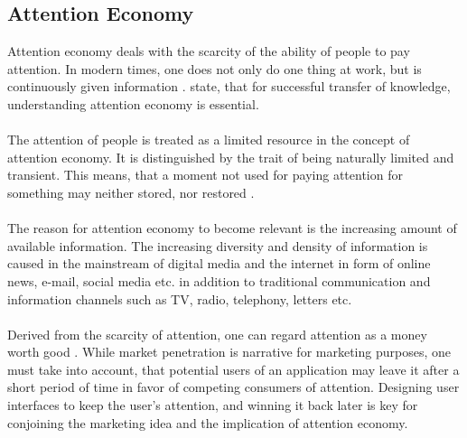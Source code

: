 \subsection{Attention Economy \label{ssec:attention}}\label{beginAtt}
Attention economy deals with the scarcity of the ability of people to pay attention. In modern times, one does not only do one thing at work, but is continuously given information  \parencite[cf.][]{Davenport.2001}. \textcite{Davenport.2001} state, that for successful transfer of knowledge, understanding attention economy is essential. 

\paragraph*{} The attention of people is treated as a limited resource in the concept of attention economy. It is distinguished by the trait of being naturally limited and transient. This means, that a moment not used for paying attention for something may neither stored, nor restored \parencite[cf.][]{Davenport.2001}.

\paragraph*{} The reason for attention economy to become relevant is the increasing amount of available information. The increasing diversity and density of information is caused in the mainstream of digital media and the internet in form of online news, e-mail, social media etc. in addition to traditional communication and information channels such as TV, radio, telephony, letters etc.

\paragraph*{} Derived from the scarcity of attention, one can regard attention as a money worth good \parencite[cf.][]{Davenport.2001}. While market penetration is narrative for marketing purposes, one must take into account, that potential users of an application may leave it after a short period of time in favor of competing consumers of attention. Designing user interfaces to keep the user's attention, and winning it back later is key for conjoining the marketing idea and the implication of attention economy.\label{endAtt}